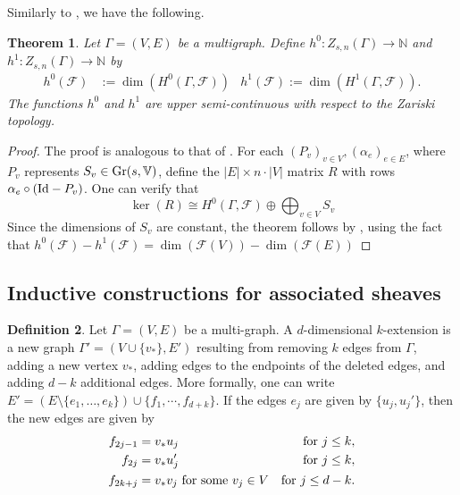 \documentclass{article}
\newtheorem{theorem}{Theorem}[section]
\theoremstyle{definition}
\newtheorem{definition}[theorem]{Definition}
\theoremstyle{remark}
\begin{document}
Similarly to , we have the following.
\begin{theorem}\label{thm: Genericity_F}
Let $\Gamma=(V,E)$ be a multigraph. Define $h^{0}: Z_{s, n}(\Gamma) \rightarrow \mathbb{N}$ and $h^{1}: Z_{s, n}(\Gamma) \rightarrow \mathbb{N}$ by
\begin{align*}
    h^{0}(\mathcal{F})& := \dim(H^{0}(\Gamma, \mathcal{F})) & h^{1}(\mathcal{F}) :=  \dim(H^{1}(\Gamma, \mathcal{F})).
\end{align*}
 The functions $h^{0}$ and $h^{1}$ are upper semi-continuous with respect to the Zariski topology.
\end{theorem}
\begin{proof}
    The proof is analogous to that of . For each $(P_{v})_{v\in V}, (\alpha_{e})_{e\in E}$, where $P_v$ represents $S_{v}\in \textup{Gr}(s, \mathbb{V})$, define the $|E|\times n\cdot |V|$ matrix $R$ with rows $\alpha_{e} \circ (\textup{Id} - P_{v})$.
    One can verify that
    \begin{equation*}
        \ker(R) \cong H^{0}(\Gamma, \mathcal{F}) \oplus \bigoplus_{v\in V} S_{v}
    \end{equation*}
    Since the dimensions of $S_{v}$ are constant, the theorem follows by , using the fact that $h^{0}(\mathcal{F}) - h^{1}(\mathcal{F}) =\dim(\mathcal{F}(V)) - \dim(\mathcal{F}(E))$ 
\end{proof}


\subsection{Inductive constructions for associated sheaves}

\begin{definition}
    Let $\Gamma=(V, E)$ be a multi-graph. A $d$-dimensional $k$-extension is a new graph $\Gamma'= (V\cup \{v_*\},  E')$ resulting from removing $k$ edges from $\Gamma$, adding a new vertex $v_{*}$, adding edges to the endpoints of the deleted edges, and adding $d - k$ additional edges. More formally, one can write $E' = \left(E\setminus \{e_1, \dots, e_k\}\right) \cup \{f_1, \cdots, f_{d+k}\}$. If the edges $e_j$ are given by $\{u_j, u_j'\}$, then the new edges are given by 
    \begin{align*}
        f_{2j-1} &= v_* u_j & \textup{for $j \leq k$},\\
        f_{2j} &= v_* u_j' & \textup{for $j \leq k$}, \\
        f_{2k+j} &= v_* v_j \textup{ for some $v_j \in V$} & \textup{for $j \leq d-k$}.
    \end{align*}
\end{definition}
\end{document}
